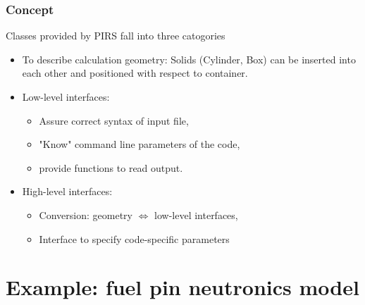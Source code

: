 \documentclass[t]{beamer}
\begin{document}
\begin{frame}[fragile]

\end{frame}


\begin{frame}\frametitle{Concept}
    \begin{block}{Classes provided by PIRS fall into three catogories}
        \begin{itemize}
            \item To describe calculation geometry:
                  Solids (Cylinder, Box) can be inserted into each other and
                  positioned with respect to container.

            \item Low-level interfaces:
                \begin{itemize}
                    \item Assure correct syntax of input file, 
                    \item "Know" command line parameters of the code, 
                    \item provide functions to read output. 
                \end{itemize}

            \item High-level interfaces:
                \begin{itemize}
                    \item Conversion: geometry $\Longleftrightarrow$ low-level interfaces,
                    \item Interface to specify code-specific parameters
                \end{itemize}
        \end{itemize}
    \end{block}
\end{frame}


\section{Example: fuel pin neutronics model}
\end{document}
